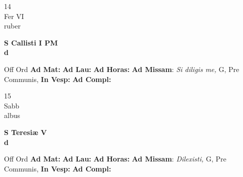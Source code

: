 \documentclass[10pt, openany]{book}
\begin{document}
        \begin{center}
            \begin{minipage}{3.5in}
                \vspace{2em}
                \begin{minipage}{0.5in}
                    {\Huge 14} \\
                    {\normalsize Fer VI} \\
                    {\normalsize ruber}
                \end{minipage}
                \begin{minipage}{3.0in}
                    \textbf{ \large S Callisti I PM \\
                    \textnormal{\normalsize d}} \\ 
                \end{minipage}
                \begin{justify}Off Ord
                    \textbf{Ad Mat: }
                    \textbf{Ad Lau: }
                    \textbf{Ad Horas: }\textbf{Ad Missam}: \textit{Si diligis me,} G, Pre Communis,  
                    \textbf{In Vesp: }
                    \textbf{Ad Compl: }
                \end{justify}
            \end{minipage}
        \end{center}
    
        \begin{center}
            \begin{minipage}{3.5in}
                \vspace{2em}
                \begin{minipage}{0.5in}
                    {\Huge 15} \\
                    {\normalsize Sabb} \\
                    {\normalsize albus}
                \end{minipage}
                \begin{minipage}{3.0in}
                    \textbf{ \large S Teresiæ V \\
                    \textnormal{\normalsize d}} \\ 
                \end{minipage}
                \begin{justify}Off Ord
                    \textbf{Ad Mat: }
                    \textbf{Ad Lau: }
                    \textbf{Ad Horas: }\textbf{Ad Missam}: \textit{Dilexisti,} G, Pre Communis,  
                    \textbf{In Vesp: }
                    \textbf{Ad Compl: }
                \end{justify}
            \end{minipage}
        \end{center}
    
\end{document}
